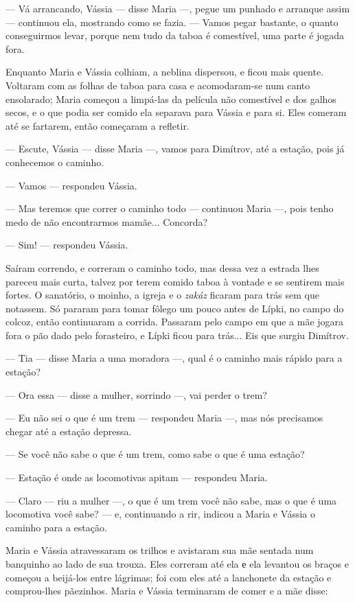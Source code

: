 --- Vá arrancando, Vássia --- disse Maria ---, pegue um punhado e
arranque assim --- continuou ela, mostrando como se fazia. --- Vamos
pegar bastante, o quanto conseguirmos levar, porque nem tudo da taboa é
comestível, uma parte é jogada fora.

Enquanto Maria e Vássia colhiam, a neblina dispersou, e ficou mais
quente. Voltaram com as folhas de taboa para casa e acomodaram-se num
canto ensolarado; Maria começou a limpá-las da película não comestível e
dos galhos secos, e o que podia ser comido ela separava para Vássia e
para si. Eles comeram até se fartarem, então começaram a refletir.

--- Escute, Vássia --- disse Maria ---, vamos para Dimítrov, até a
estação, pois já conhecemos o caminho.

--- Vamos --- respondeu Vássia.

--- Mas teremos que correr o caminho todo --- continuou Maria ---, pois
tenho medo de não encontrarmos mamãe... Concorda?

--- Sim! --- respondeu Vássia.

Saíram correndo, e correram o caminho todo, mas dessa vez a estrada lhes
pareceu mais curta, talvez por terem comido taboa à vontade e se
sentirem mais fortes. O sanatório, o moinho, a igreja e o \emph{zakáz}
ficaram para trás sem que notassem. Só pararam para tomar fôlego um
pouco antes de Lípki, no campo do colcoz, então continuaram a corrida.
Passaram pelo campo em que a mãe jogara fora o pão dado pelo forasteiro,
e Lípki ficou para trás... Eis que surgiu Dimítrov.

--- Tia --- disse Maria a uma moradora ---, qual é o caminho mais rápido
para a estação?

--- Ora essa --- disse a mulher, sorrindo ---, vai perder o trem?

--- Eu não sei o que é um trem --- respondeu Maria ---, mas nós
precisamos chegar até a estação depressa.

--- Se você não sabe o que é um trem, como sabe o que é uma estação?

--- Estação é onde as locomotivas apitam --- respondeu Maria.

--- Claro --- riu a mulher ---, o que é um trem você não sabe, mas o que
é uma locomotiva você sabe? --- e, continuando a rir, indicou a Maria e
Vássia o caminho para a estação.

Maria e Vássia atravessaram os trilhos e avistaram sua mãe sentada num
banquinho ao lado de sua trouxa. Eles correram até ela е ela levantou os
braços e começou a beijá-los entre lágrimas; foi com eles até a
lanchonete da estação e comprou-lhes pãezinhos. Maria e Vássia
terminaram de comer e a mãe disse:

